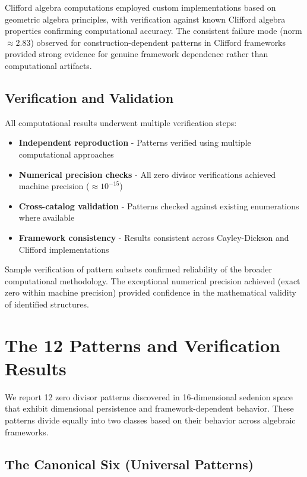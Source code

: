 \documentclass[11pt]{article}
\begin{document}
Clifford algebra computations employed custom implementations based on geometric algebra principles, with verification against known Clifford algebra properties confirming computational accuracy. The consistent failure mode (norm $\approx 2.83$) observed for construction-dependent patterns in Clifford frameworks provided strong evidence for genuine framework dependence rather than computational artifacts.

\subsection{Verification and Validation}

All computational results underwent multiple verification steps:

\begin{itemize}
\item \textbf{Independent reproduction} - Patterns verified using multiple computational approaches
\item \textbf{Numerical precision checks} - All zero divisor verifications achieved machine precision ($\approx 10^{-15}$)
\item \textbf{Cross-catalog validation} - Patterns checked against existing enumerations where available
\item \textbf{Framework consistency} - Results consistent across Cayley-Dickson and Clifford implementations
\end{itemize}

Sample verification of pattern subsets confirmed reliability of the broader computational methodology. The exceptional numerical precision achieved (exact zero within machine precision) provided confidence in the mathematical validity of identified structures.
\section{The 12 Patterns and Verification Results}
\label{sec:results}

We report 12 zero divisor patterns discovered in 16-dimensional sedenion space that exhibit dimensional persistence and framework-dependent behavior. These patterns divide equally into two classes based on their behavior across algebraic frameworks.

\subsection{The Canonical Six (Universal Patterns)}
\end{document}
